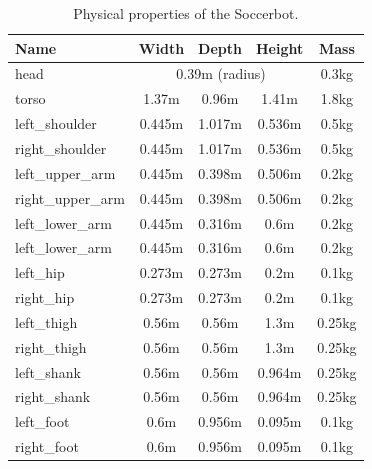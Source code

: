 \begin{table}
\centering
\begin{tabular}[htbp]{|l|c|c|c|c|}
  \hline
  {\bf Name} & {\bf Width} & {\bf Depth} & {\bf Height} & {\bf Mass} \\
  \hline\hline
  head & \multicolumn{3}{|c|}{0.39m (radius)} & 0.3kg\\ \hline
  torso & 1.37m & 0.96m & 1.41m & 1.8kg \\ \hline
  left\_shoulder & 0.445m & 1.017m & 0.536m & 0.5kg \\ \hline
  right\_shoulder & 0.445m & 1.017m & 0.536m & 0.5kg \\ \hline
  left\_upper\_arm & 0.445m & 0.398m & 0.506m & 0.2kg \\ \hline
  right\_upper\_arm & 0.445m & 0.398m & 0.506m & 0.2kg \\ \hline
  left\_lower\_arm & 0.445m & 0.316m & 0.6m & 0.2kg \\ \hline
  left\_lower\_arm & 0.445m & 0.316m & 0.6m & 0.2kg \\ \hline
  left\_hip & 0.273m & 0.273m & 0.2m & 0.1kg \\ \hline
  right\_hip & 0.273m & 0.273m & 0.2m & 0.1kg \\ \hline
  left\_thigh & 0.56m & 0.56m & 1.3m & 0.25kg \\ \hline
  right\_thigh & 0.56m & 0.56m & 1.3m & 0.25kg \\ \hline
  left\_shank & 0.56m & 0.56m & 0.964m & 0.25kg \\ \hline
  right\_shank & 0.56m & 0.56m & 0.964m & 0.25kg \\ \hline
  left\_foot & 0.6m & 0.956m & 0.095m & 0.1kg \\ \hline
  right\_foot & 0.6m & 0.956m & 0.095m & 0.1kg \\
  \hline
\end{tabular}
\caption{Physical properties of the Soccerbot.}
\label{table:dimensions}
\end{table}






